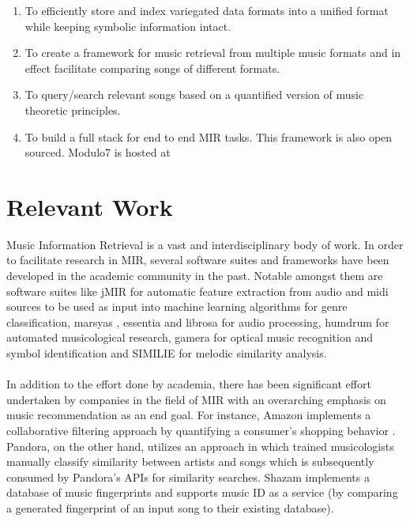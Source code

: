 \documentclass{article}
\begin{document}
\begin{enumerate}
\item To efficiently store and index variegated data formats into a unified format while keeping symbolic information intact.
\item To create a framework for music retrieval from multiple music formats and in effect facilitate comparing songs of different formats.
\item To query/search relevant songs based on a quantified version of music theoretic principles. 
\item To build a full stack for end to end MIR tasks. This framework is also open sourced. Modulo7 is hosted at \cite{m7code}
\end{enumerate}

%
\section{Relevant Work} \label{sec:relevantwork}

Music Information Retrieval is a vast and interdisciplinary body of work. In order to facilitate research in MIR, several software suites and frameworks have been developed in the academic community in the past. Notable amongst them are software suites like jMIR \cite{jMIR} for automatic feature extraction from audio and midi sources to be used as input into machine learning algorithms for genre classification, marsyas \cite{marsyas}, essentia \cite{essentia} and librosa \cite{librosa} for audio processing, humdrum \cite{humdrum} for automated musicological research, gamera \cite{gamera} for optical music recognition and symbol identification and SIMILIE \cite{similie} for melodic similarity analysis. \\\\
In addition to the effort done by academia, there has been significant effort undertaken by companies in the field of MIR with an overarching emphasis on music recommendation as an end goal. For instance, Amazon implements a collaborative filtering approach by quantifying a consumer's shopping behavior \cite{amazonreco}. Pandora, on the other hand, utilizes an approach in which trained musicologists manually classify similarity between artists and songs \cite{musicgenomepandora} which is subsequently consumed by Pandora's APIs for similarity searches. Shazam \cite{shazam} implements a database of music fingerprints and supports music ID as a service (by comparing a generated fingerprint of an input song to their existing database). 
 
\end{document}
